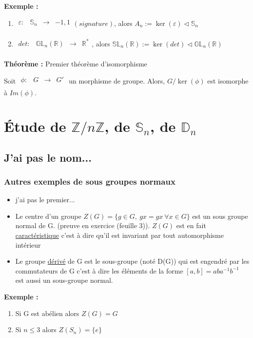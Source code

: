 \documentclass{report}
\newenvironment{exemple}{\begin{tcolorbox}[colback=gray!10,colframe= white]
    \textbf{Exemple :}
     \par}
    {\end{tcolorbox}}
\newenvironment{theoreme}[1][]{
    \begin{tcolorbox}[]
    \textbf{Théorème :} #1  \par} 
    {\end{tcolorbox}}
\newcommand{\fctsarg}[3]{
    \begin{array}{lrcl}
    #1: & #2 & \longrightarrow & #3 \\
    \end{array}
}
\newcommand{\Z}{\mathbb{Z}}
\newcommand{\R}{\mathbb{R}}
\newcommand{\znz}{\Z/n\Z}
\newcommand{\sn}{\mathbb{S}_n}
\newcommand{\dsp}{\displaystyle}
\begin{document}
\begin{exemple}
    \begin{enumerate}
        \item $\fctsarg{\varepsilon}{\mathbb{S}_n}{-1,1} (signature)$, alors $A_n := \ker(\varepsilon) \triangleleft \mathbb{S}_n$
        \item $\fctsarg{det}{\mathbb{GL}_n(\R)}{\R^*}$, alors $\mathbb{SL}_n(\R) := \ker(det) \triangleleft \mathbb{GL}_n(\R)$
    \end{enumerate}
\end{exemple}

\begin{theoreme}[Premier théorème d'isomorphisme]
    Soit $\fctsarg{\phi}{G}{G'}$ un morphisme de groupe. Alors, $G/\ker(\phi)$ est isomorphe à $Im(\phi)$.
\end{theoreme}

\chapter{\texorpdfstring{Étude de $\znz$, de $\sn$, de $\mathbb{D}_{n}$}{Etude de Z/nZ, Sn, Dn}}

\section{J'ai pas le nom...}




\subsection{Autres exemples de sous groupes normaux}

\begin{itemize}
\item j'ai pas le premier...
\item Le centre d'un groupe $\dsp Z(G)=\{g\in G,~gx=gx~\forall x\in G\}$ est un sous groupe normal de G. (preuve en exercice (feuille 3)). $Z(G)$ est en fait \underline{caractéristique} c'est à dire qu'il est invariant par tout automorphisme intérieur
\item Le groupe \underline{dérivé} de G est le sous-groupe (noté D(G)) qui est engendré par les commutateurs de G c'est à dire les éléments de la forme $[a,b]=aba^{-1}b^{-1}$ est aussi un sous-groupe normal.
\end{itemize}

\begin{exemple}
    \begin{enumerate}
        \item Si G est abélien alors $Z(G)=G$
        \item Si $n\leq3$ alors $Z(S_{n})=\{e\}$
    \end{enumerate}
\end{exemple}
\end{document}
